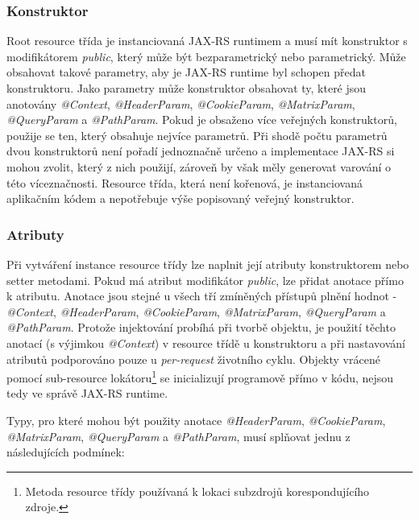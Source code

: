 \documentclass[11pt,twoside,a4paper]{book}
\begin{document}
\subsubsection{Konstruktor}

Root resource třída je instanciovaná JAX-RS runtimem a musí mít konstruktor s
modifikátorem {\em public}, který může být bezparametrický nebo parametrický.
Může obsahovat takové parametry, aby je JAX-RS runtime byl schopen předat konstruktoru. Jako parametry
může konstruktor obsahovat ty, které jsou anotovány {\em @Context}, {\em @HeaderParam},
{\em @CookieParam}, {\em @MatrixParam}, {\em @QueryParam} a {\em @PathParam}. Pokud je obsaženo více
veřejných konstruktorů, použije se ten, který obsahuje nejvíce parametrů. Při
shodě počtu parametrů dvou konstruktorů není pořadí jednoznačně určeno a implementace JAX-RS si
mohou zvolit, který z nich použijí, zároveň by však měly generovat varování o
této víceznačnosti. Resource třída, která není kořenová, je instanciovaná
aplikačním kódem a nepotřebuje výše popisovaný veřejný konstruktor.

\subsubsection{Atributy}
\label{ch:atributy}

Při vytváření instance resource třídy lze naplnit její atributy konstruktorem nebo setter
metodami. Pokud má atribut modifikátor {\em public}, lze přidat anotace přímo k
atributu. Anotace jsou stejné u všech tří zmíněných přístupů plnění hodnot - {\em @Context}, {\em @HeaderParam},
{\em @CookieParam}, {\em @MatrixParam}, {\em @QueryParam} a {\em @PathParam}. Protože injektování probíhá
při tvorbě objektu, je použití těchto anotací (s výjimkou {\em @Context}) v
resource třídě u konstruktoru a při nastavování atributů podporováno pouze u {\em per-request}
životního cyklu. Objekty vrácené pomocí sub-resource lokátoru\footnote{Metoda
resource třídy používaná k lokaci subzdrojů korespondujícího zdroje.} se
inicializují programově přímo v kódu, nejsou tedy ve správě JAX-RS runtime.

Typy, pro které mohou být použity anotace {\em @HeaderParam}, {\em @CookieParam}, {\em @MatrixParam},
{\em @QueryParam} a {\em @PathParam}, musí splňovat jednu z následujících podmínek:
\end{document}
